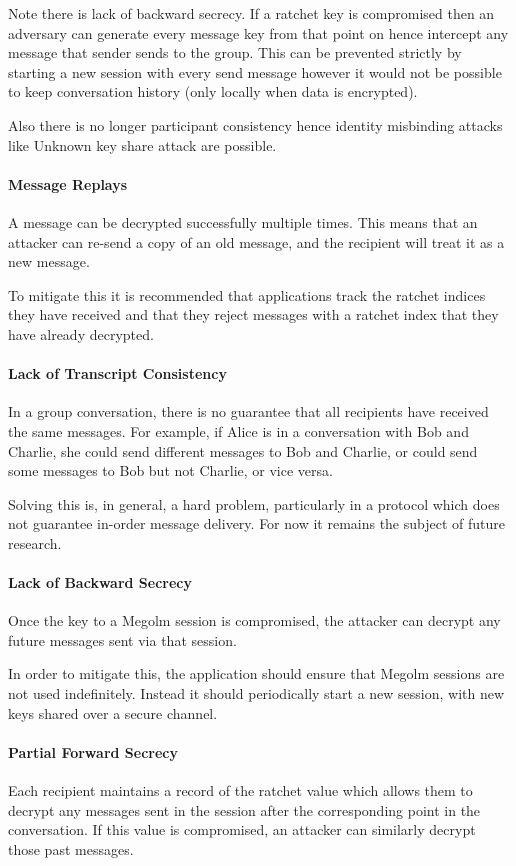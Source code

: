 Note there is lack of backward secrecy. If a ratchet key is compromised then an adversary can generate every message key from that point on hence intercept any message that sender sends to the group. This can be prevented strictly by starting a new session with every send message however it would not be possible to keep conversation history (only locally when data is encrypted).

Also there is no longer participant consistency hence identity misbinding attacks like Unknown key share attack are possible. %

\paragraph{Message Replays}
A message can be decrypted successfully multiple times. This means that an attacker can re-send a copy of an old message, and the recipient will treat it as a new message.

To mitigate this it is recommended that applications track the ratchet indices they have received and that they reject messages with a ratchet index that they have already decrypted.

\paragraph{Lack of Transcript Consistency}
In a group conversation, there is no guarantee that all recipients have received the same messages. For example, if Alice is in a conversation with Bob and Charlie, she could send different messages to Bob and Charlie, or could send some messages to Bob but not Charlie, or vice versa.

Solving this is, in general, a hard problem, particularly in a protocol which does not guarantee in-order message delivery. For now it remains the subject of future research.

\paragraph{Lack of Backward Secrecy}
Once the key to a Megolm session is compromised, the attacker can decrypt any future messages sent via that session.

In order to mitigate this, the application should ensure that Megolm sessions are not used indefinitely. Instead it should periodically start a new session, with new keys shared over a secure channel.

\paragraph{Partial Forward Secrecy}
Each recipient maintains a record of the ratchet value which allows them to decrypt any messages sent in the session after the corresponding point in the conversation. If this value is compromised, an attacker can similarly decrypt those past messages.

